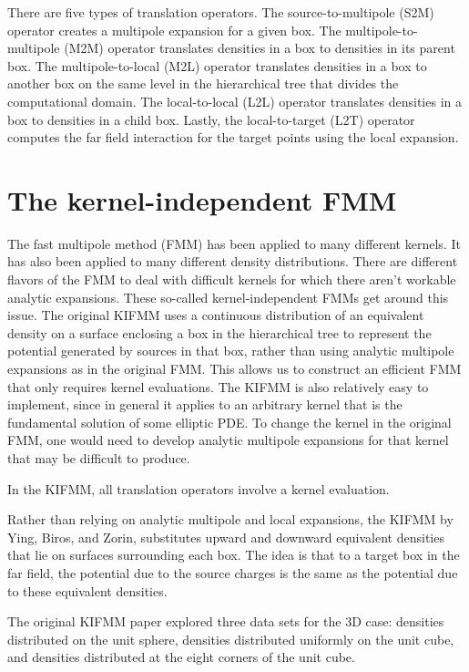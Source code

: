 \documentclass[11pt, oneside]{article}   	%
\begin{document}
There are five types of translation operators. The source-to-multipole (S2M) operator creates a multipole expansion for a given box. The multipole-to-multipole (M2M) operator translates densities in a box to densities in its parent box. The multipole-to-local (M2L) operator translates densities in a box to another box on the same level in the hierarchical tree that divides the computational domain. The local-to-local (L2L) operator translates densities in a box to densities in a child box. Lastly, the local-to-target (L2T) operator computes the far field interaction for the target points using the local expansion.

\section{The kernel-independent FMM}
The fast multipole method (FMM) has been applied to many different kernels. It has also been applied to many different density distributions. There are different flavors of the FMM to deal with difficult kernels for which there aren't workable analytic expansions. These so-called kernel-independent FMMs get around this issue. The original KIFMM uses a continuous distribution of an equivalent density on a surface enclosing a box in the hierarchical tree to represent the potential generated by sources in that box, rather than using analytic multipole expansions as in the original FMM. This allows us to construct an efficient FMM that only requires kernel evaluations. The KIFMM is also relatively easy to implement, since in general it applies to an arbitrary kernel that is the fundamental solution of some elliptic PDE. To change the kernel in the original FMM, one would need to develop analytic multipole expansions for that kernel that may be difficult to produce.

In the KIFMM, all translation operators involve a kernel evaluation.

Rather than relying on analytic multipole and local expansions, the KIFMM by Ying, Biros, and Zorin, substitutes upward and downward equivalent densities that lie on surfaces surrounding each box. The idea is that to a target box in the far field, the potential due to the source charges is the same as the potential due to these equivalent densities.

The original KIFMM paper explored three data sets for the 3D case: densities distributed on the unit sphere, densities distributed uniformly on the unit cube, and densities distributed at the eight corners of the unit cube.
\end{document}
